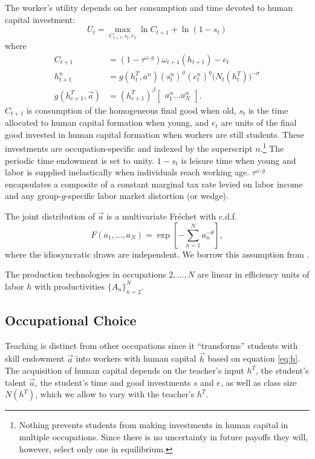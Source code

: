 \documentclass[onehalfspacing,11pt]{article}
\begin{document}
The worker's utility depends on her consumption and time devoted to human capital investment:
\begin{equation}
\label{ }
U_t = \max_{C_{t+!},s_t,e_t}\ln C_{t+1} + \ln\left(1-s_t\right)
\end{equation}
where
\begin{align}
\label{}
C_{t+1} & =(1-\tau^{\omega,g})\omega_{t+1}(h_{t+1})-e_{t} \\ %
h_{t+1}^n & =g(h_{t}^T,a^n)(s_t^n)^{\phi} (e_t^n)^{\eta}\big(N_t(h_t^T)\big)^{-\sigma} \label{eq:h}\\
g(h_{c+1}^T,\vec{a}) & =(h_{c+1}^T)^\beta \begin{bmatrix}a_1^\alpha \ldots a_N^\alpha \end{bmatrix}.
\end{align}
$C_{t+1}$ is consumption of the homogeneous final good when old, $s_t$ is the time allocated to human capital formation when young, and $e_t$ are units of the final good invested in human capital formation when workers are still students. These investments are occupation-specific and indexed by the superscript $n$.\footnote{Nothing prevents students from making investments in human capital in multiple occupations. Since there is no uncertainty in future payoffs they will, however, select only one in equilibrium.} The periodic time endowment is set to unity. $1-s_t$ is leisure time when young and labor is supplied inelastically when individuals reach working age. $\tau^{\omega,g}$ encapsulates a composite of a constant marginal tax rate levied on labor income and any group-$g$-specific labor market distortion (or wedge).

The joint distribution of $\vec{a}$ is a multivariate Fr\'echet with c.d.f.
\begin{equation}
\label{ }
F(a_1,\ldots,a_N) = \exp \left[ -\sum_{n=1}^N a_n^{-\theta} \right],
\end{equation}
where the idiosyncratic draws are independent. We borrow this assumption from \cite{Eaton:2002}.

The production technologies in occupations $2,\ldots,N$ are linear in efficiency units of labor $h$ with productivities $\{A_n\}_{n=2}^N$.

\subsection{Occupational Choice}
Teaching is distinct from other occupations since it ``transforms'' students with skill endowment $\vec{a}$ into workers with human capital $\vec{h}$ based on equation \eqref{eq:h}. The acquisition of human capital depends on the teacher's input $h^T$, the student's talent $\vec{a}$, the student's time and good investments $s$ and $e$, as well as class size $N(h^T)$, which we allow to vary with the teacher's $h^T$.
\end{document}
